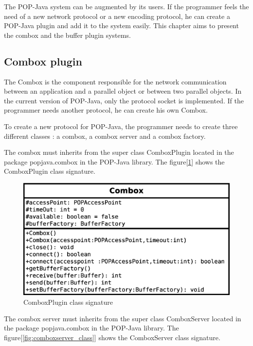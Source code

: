 \label{plugin}
The POP-Java system can be augmented by its users. If the programmer feels the need of a new network protocol or a new encoding protocol, he can create a POP-Java plugin and add it to the system easily. This chapter aims to present the combox and the buffer plugin systems.


\subsection{Combox plugin}
The Combox is the component responsible for the network communication between an application and a parallel object or between two parallel objects. In the current version of POP-Java, only the protocol socket is implemented. If the programmer needs another protocol, he can create his own Combox. \s

To create a new protocol for POP-Java, the programmer needs to create three different classes : a combox, a combox server and a combox factory.\s

The combox must inherits from the super class ComboxPlugin located in the package popjava.combox in the POP-Java library. The figure[\ref{fig:combox_class}] shows the ComboxPlugin class signature. 

\begin{figure}[ht]
\caption{ComboxPlugin class signature}
\center
\label{fig:combox_class}
\includegraphics[scale=0.5]{combox.eps}
\end{figure}
\pagebreak

The combox server must inherits from the super class ComboxServer located in the package popjava.combox in the POP-Java library. The figure[\ref{fig:comboxserver_class}] shows the ComboxServer class signature. 

